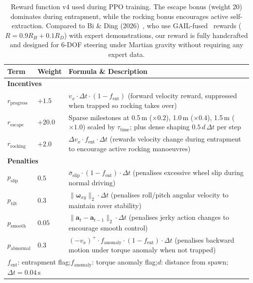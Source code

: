 \documentclass[12pt,a4paper]{article}
\begin{document}
\vspace{6pt}

\begin{tcolorbox}[dashedbox, left=0pt, right=0pt, top=4pt, bottom=4pt]
\begin{table}[H]
\centering
\small
\setlength{\tabcolsep}{8pt}
\renewcommand{\arraystretch}{1.4}
\begin{tabularx}{\linewidth}{llX}
\toprule
\rowcolor{gray!20}
\textbf{Term} & \textbf{Weight} & \textbf{Formula \& Description} \\
\midrule
\multicolumn{3}{l}{\textbf{Incentives}} \\
\midrule
$r_{\text{progress}}$ & $+1.5$  & $v_x \cdot \Delta t \cdot (1 - f_{\text{ent}})$ \quad (forward velocity reward, suppressed when trapped so rocking takes over) \\
$r_{\text{escape}}$   & $+20.0$ & Sparse milestones at 0.5\,m ($\times0.2$), 1.0\,m ($\times0.4$), 1.5\,m ($\times1.0$) scaled by $\tau_{\text{time}}$; plus dense shaping $0.5\,d\,\Delta t$ per step \\
$r_{\text{rocking}}$  & $+2.0$  & $\Delta v_x \cdot f_{\text{ent}} \cdot \Delta t$ \quad (rewards velocity change during entrapment to encourage active rocking manoeuvres) \\
\midrule
\multicolumn{3}{l}{\textbf{Penalties}} \\
\midrule
$p_{\text{slip}}$     & $0.5$  & $\bar{\sigma}_{\text{slip}} \cdot (1 - f_{\text{ent}}) \cdot \Delta t$ \quad (penalises excessive wheel slip during normal driving) \\
$p_{\text{tilt}}$     & $0.3$  & $\|\boldsymbol{\omega}_{xy}\|_2 \cdot \Delta t$ \quad (penalises roll/pitch angular velocity to maintain rover stability) \\
$p_{\text{smooth}}$   & $0.05$ & $\|\mathbf{a}_t - \mathbf{a}_{t-1}\|_2 \cdot \Delta t$ \quad (penalises jerky action changes to encourage smooth control) \\
$p_{\text{abnormal}}$ & $0.3$  & $(-v_x)^{+} \cdot f_{\text{anomaly}} \cdot (1 - f_{\text{ent}}) \cdot \Delta t$ \quad (penalises backward motion under torque anomaly when not trapped) \\
\bottomrule
\multicolumn{3}{l}{\footnotesize $f_{\text{ent}}$: entrapment flag;\enspace $f_{\text{anomaly}}$: torque anomaly flag;\enspace $d$: distance from spawn;\enspace $\Delta t = 0.04\,\text{s}$}
\end{tabularx}
\caption{Reward function v4 used during PPO training. The escape bonus (weight 20) dominates during entrapment, while the rocking bonus encourages active self-extraction. Compared to Bi \& Ding (2026)~\cite{bi2026escape}, who use GAIL-fused~\cite{ho2016gail} rewards ($R = 0.9R_H + 0.1R_D$) with expert demonstrations, our reward is fully handcrafted and designed for 6-DOF steering under Martian gravity without requiring any expert data.}
\label{tab:reward_function}
\end{table}
\end{tcolorbox}
\end{document}
